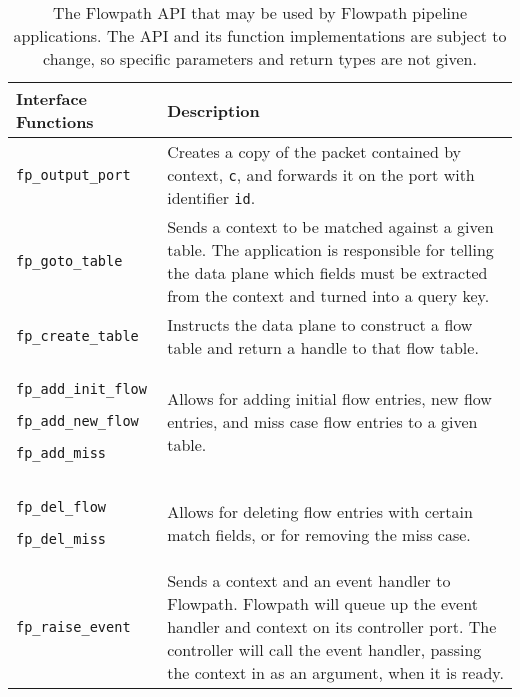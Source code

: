 \begin{table}
\caption{The Flowpath API that may be used by Flowpath pipeline applications. The API and its function implementations are subject to change, so specific parameters and return types are not given.}
\begin{center}
\begin{tabular}{| p{0.3\linewidth} | p{0.7\linewidth} |}
\hline
Interface Functions & Description \\

\hline
\texttt{fp\_output\_port} & 

Creates a copy of the packet contained by context, \texttt{c}, and forwards it on the port with identifier \texttt{id}. \\
\hline 

\texttt{fp\_goto\_table} & 
Sends a context to be matched against a given table. The application is responsible for telling the data plane which fields must be extracted from the context and turned into a query key. \\

\hline

\texttt{fp\_create\_table} &
Instructs the data plane to construct a flow table and return a handle to that flow table. \\
\hline


\texttt{fp\_add\_init\_flow}

\texttt{fp\_add\_new\_flow} 

\texttt{fp\_add\_miss}

&

Allows for adding initial flow entries, new flow entries, and miss case flow entries to a given table. \\
\hline

\texttt{fp\_del\_flow}

\texttt{fp\_del\_miss} &

Allows for deleting flow entries with certain match fields, or for removing the miss case. \\

\hline


\texttt{fp\_raise\_event} &

Sends a context and an event handler to Flowpath. Flowpath will queue up the event handler and context on its controller port. The controller will call the event handler, passing the context in as an argument, when it is ready. \\
\hline


\end{tabular}
\end{center}
\end{table}
